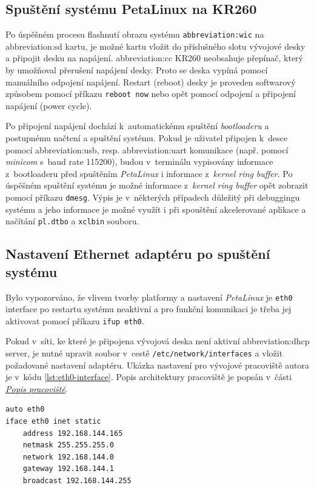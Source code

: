 \documentclass[a4paper, twoside, 11pt]{article}
\begin{document}
	\subsection{Spuštění systému PetaLinux na KR260}
		Po úspěšném procesu flashnutí obrazu systému \texttt{\gls{abbreviation:wic}} na \gls{abbreviation:sd} kartu, je možné kartu vložit do příslušného slotu vývojové desky a připojit desku na napájení. \gls{abbreviation:cc} KR260 neobsahuje přepínač, který by umožňoval přerušení napájení desky. Proto se deska vypíná pomocí manuálního odpojení napájení. Restart (reboot) desky je proveden softwarový způsobem pomocí příkazu \texttt{reboot now} nebo opět pomocí odpojení a připojení napájení (power cycle).\par
		Po připojení napájení dochází k~automatickému spuštění \textit{bootloaderu} a postupnému načtení a spuštění systému. Pokud je uživatel připojen k~desce pomocí \gls{abbreviation:usb}, resp. \gls{abbreviation:uart} komunikace (např. pomocí \textit{minicom} s~baud rate 115200), budou v~terminálu vypisovány informace z~bootloaderu před spuštěním \textit{PetaLinux} i informace z~\textit{kernel ring buffer}. Po úspěšném spuštění systému je možné informace z~\textit{kernel ring buffer} opět zobrazit pomocí příkazu \texttt{dmesg}. Výpis je v~některých případech důležitý při debuggingu systému a jeho informace je možné využít i při spouštění akcelerované aplikace a načítání \texttt{pl.dtbo} a \texttt{xclbin} souboru.\par

	\subsection{Nastavení Ethernet adaptéru po spuštění systému}
		Bylo vypozorváno, že vlivem tvorby platformy a nastavení \textit{PetaLinux} je \texttt{eth0} interface po restartu systému neaktivní a pro funkční komunikaci je třeba jej aktivovat pomocí příkazu \texttt{ifup eth0}.\par
		Pokud v~síti, ke které je připojena vývojová deska není aktivní \gls{abbreviation:dhcp} server, je nutné upravit soubor v~cestě \texttt{/etc/network/interfaces} a vložit požadované nastavení adaptéru. Ukázka nastavení pro vývojové pracoviště autora je v~kódu \ref{lst:eth0-interface}. Popis architektury pracoviště je popsán v~části \hyperref[sec:popis-pracoviste]{\textit{Popis pracoviště}}.\par

\begin{lstlisting}[language={sh}, caption={Nastavení eth0 interface pro KR260 vývojovou desku na vývojovém pracovišti autora.}, label={lst:eth0-interface}, morekeywords={auto, iface, address, netmask, network, gateway, broadcast}]
auto eth0
iface eth0 inet static
	address 192.168.144.165
	netmask 255.255.255.0
	network 192.168.144.0
	gateway 192.168.144.1
	broadcast 192.168.144.255\end{lstlisting}
\end{document}
